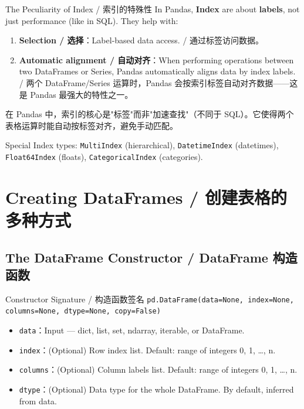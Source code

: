 \documentclass[11pt,a4paper]{report}
\let\oldtexttt\texttt
\renewcommand{\texttt}[1]{\textcolor{mainblue}{\oldtexttt{#1}}}
\begin{document}
\begin{concept}{The Peculiarity of Index / 索引的特殊性}
    In Pandas, \textbf{Index} are about \textbf{labels}, not just performance (like in SQL). They help with:
    \begin{enumerate}[itemsep=0.3em]
        \item \textbf{Selection / 选择}：Label-based data access. / 通过标签访问数据。
        \item \textbf{Automatic alignment / 自动对齐}：When performing operations between two DataFrames or Series, Pandas automatically aligns data by index labels. / 两个 DataFrame/Series 运算时，Pandas 会按索引标签自动对齐数据——这是 Pandas 最强大的特性之一。
    \end{enumerate}
    在 Pandas 中，索引的核心是"标签"而非"加速查找"（不同于 SQL）。它使得两个表格运算时能自动按标签对齐，避免手动匹配。

    Special Index types: \texttt{MultiIndex} (hierarchical), \texttt{DatetimeIndex} (datetimes), \texttt{Float64Index} (floats), \texttt{CategoricalIndex} (categories).
\end{concept}

\section{Creating DataFrames / 创建表格的多种方式}

\subsection{The DataFrame Constructor / DataFrame 构造函数}

\begin{concept}{Constructor Signature / 构造函数签名}
    \texttt{pd.DataFrame(data=None, index=None, columns=None, dtype=None, copy=False)}
    \begin{itemize}[itemsep=0.3em]
        \item \texttt{data}：Input — dict, list, set, ndarray, iterable, or DataFrame.
        \item \texttt{index}：(Optional) Row index list. Default: range of integers 0, 1, …, n.
        \item \texttt{columns}：(Optional) Column labels list. Default: range of integers 0, 1, …, n.
        \item \texttt{dtype}：(Optional) Data type for the whole DataFrame. By default, inferred from data.
    \end{itemize}
\end{concept}
\end{document}
